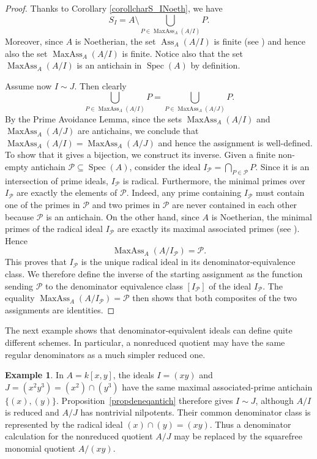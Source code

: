 \documentclass[11pt,leqno]{amsart}
\theoremstyle{definition}
\newtheorem{example}[theorem]{Example}
\numberwithin{equation}{section}
\DeclareMathOperator{\Spec}{Spec}
\DeclareMathOperator{\Ass}{Ass}
\DeclareMathOperator{\MaxAss}{MaxAss}
\newcommand{\cP}{\mathcal P}
\begin{document}
\begin{proof}
Thanks to Corollary \ref{corollcharS_INoeth}, we have $$S_I = A \setminus \bigcup_{P \in \MaxAss_A(A/I)}P.$$
Moreover, since $A$ is Noetherian, the set $\Ass_A(A/I)$ is finite (see \cite[Theorem 6.5(i), p. 39]{Mat86}) and hence also the set $\MaxAss_A(A/I)$ is finite.
Notice also that the set $\MaxAss_A(A/I)$ is an antichain in $\Spec(A)$ by definition. 


Assume now $I \sim J$. Then clearly  $$\bigcup_{P \in \MaxAss_A(A/I)}P= \bigcup_{P \in \MaxAss_A(A/J)}P.$$
By the Prime Avoidance Lemma, since the sets $\MaxAss_A(A/I)$ and $\MaxAss_A(A/J)$ are antichains, we conclude that $\MaxAss_A(A/I)=\MaxAss_A(A/J)$ and hence the assignment is well-defined. To show that it gives a bijection, we construct its inverse. Given a finite non-empty antichain $\cP\subseteq\Spec(A)$, consider the ideal $I_{\cP}=\bigcap_{P\in\cP}P$. 
Since it is an intersection of prime ideals, $I_{\cP}$ is radical. Furthermore, the minimal primes over $I_{\cP}$ are exactly the elements of $\cP$. Indeed, any prime containing $I_{\cP}$ must contain one of the primes in $\cP$ and two primes in $\cP$ are never contained in each other because $\cP$ is an antichain. On the other hand, since $A$ is Noetherian, the minimal primes of the radical ideal $I_{\cP}$ are exactly its maximal associated primes (see \cite[Theorem 6.5(iii), p. 39]{Mat86}).
Hence $$\MaxAss_A(A/I_{\cP}) = \cP.$$ This proves that $I_{\cP}$ is the unique radical ideal in its denominator-equivalence class. We therefore define the inverse of the starting assignment as the function sending $\cP$ to the denominator equivalence class $[I_{\cP}]$ of the ideal $I_{\cP}$. The equality $\MaxAss_A(A/I_{\cP}) = \cP$ then shows  that both composites of the two assignments are identities.
\end{proof}



The next example shows that denominator-equivalent ideals can define quite different schemes. In particular, a nonreduced quotient may have the same regular denominators as a much simpler reduced one.

\begin{example}
In $A=k[x,y]$, the ideals
$
I=(xy)$ and $J=(x^2y^3)=(x^2)\cap(y^3)
$
have the same maximal associated-prime antichain $\{(x),(y)\}$. Proposition~\ref{propdeneqantich} therefore gives $I\sim J$, although $A/I$ is reduced and $A/J$ has nontrivial nilpotents. Their common denominator class is represented by the radical ideal
$
(x)\cap(y)=(xy).
$
Thus a denominator calculation for the nonreduced quotient $A/J$ may be replaced by the squarefree monomial quotient $A/(xy)$.
\end{example}
\end{document}
